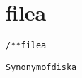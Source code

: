 \section{filea}
\begin{shaded}
\begin{alltt}
/** filea

  Synonym of diska

\end{alltt}
\end{shaded}
